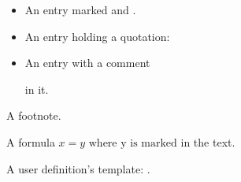 \begin{itemize}
\item An entry marked and .
\item An entry holding a quotation:
\begin{quote}\end{quote}
\item An entry with a comment 

 in it.
\end{itemize}

A footnote.

A formula \(x = y \text{ where y is marked}\) in the text.

A user definition's template: .%
\RequirePackage{amsmath}
\RequirePackage{zref-clever}
\ProvideDocumentCommand{}
\ProvideDocumentCommand{}
